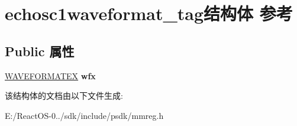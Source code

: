 \hypertarget{structechosc1waveformat__tag}{}\section{echosc1waveformat\+\_\+tag结构体 参考}
\label{structechosc1waveformat__tag}
\subsection*{Public 属性}
\begin{DoxyCompactItemize}
\item 
\mbox{\label{structechosc1waveformat__tag_acaa94fcb27b697024f726ed716bde584}} 
\hyperlink{struct_w_a_v_e_f_o_r_m_a_t_e_x}{W\+A\+V\+E\+F\+O\+R\+M\+A\+T\+EX} {\bfseries wfx}
\end{DoxyCompactItemize}


该结构体的文档由以下文件生成\+:\begin{DoxyCompactItemize}
\item 
E\+:/\+React\+O\+S-\/0../sdk/include/psdk/mmreg.\+h\end{DoxyCompactItemize}
